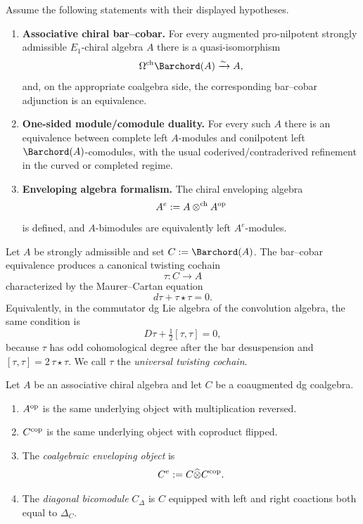 \begin{hypothesis}
\label{hyp:inputs}
Assume the following statements with their displayed hypotheses.
\begin{enumerate}[label=(I)]
\item \textbf{Associative chiral bar--cobar.}
For every augmented pro-nilpotent strongly admissible $E_1$-chiral algebra $A$ there is a
quasi-isomorphism
\[
\Cobar \Barchord(A)\xrightarrow{\sim} A,
\]
and, on the appropriate coalgebra side, the corresponding bar--cobar adjunction is an equivalence.

\item \textbf{One-sided module/comodule duality.}
For every such $A$ there is an equivalence between complete left $A$-modules and conilpotent left
$\Barchord(A)$-comodules, with the usual coderived/contraderived refinement in the curved or completed
regime.

\item \textbf{Enveloping algebra formalism.}
The chiral enveloping algebra
\[
A^e := A\mathbin{\otimes^{\mathrm{ch}}} A^{\mathrm{op}}
\]
is defined, and $A$-bimodules are equivalently left $A^e$-modules.
\end{enumerate}
\end{hypothesis}

\begin{definition}
Let $A$ be strongly admissible and set $C:=\Barchord(A)$. The bar--cobar equivalence produces a
canonical twisting cochain
\[
\tau:C\to A
\]
characterized by the Maurer--Cartan equation
\[
d\tau+\tau\star\tau=0.
\]
Equivalently, in the commutator dg Lie algebra of the convolution
algebra, the same condition is
\[
D\tau+\tfrac{1}{2}[\tau,\tau]=0,
\]
because $\tau$ has odd cohomological degree after the bar
desuspension and $[\tau,\tau]=2\,\tau\star\tau$.
We call $\tau$ the \emph{universal twisting cochain}.
\end{definition}

\begin{definition}
Let $A$ be an associative chiral algebra and let $C$ be a coaugmented dg coalgebra.
\begin{enumerate}[label=(\alph*)]
\item $A^{\mathrm{op}}$ is the same underlying object with multiplication reversed.
\item $C^{\mathrm{cop}}$ is the same underlying object with coproduct flipped.
\item The \emph{coalgebraic enveloping object} is
\[
C^e:=C\widehat\otimes C^{\mathrm{cop}}.
\]
\item The \emph{diagonal bicomodule} $C_\Delta$ is $C$ equipped with left and right coactions both
equal to $\Delta_C$.
\end{enumerate}
\end{definition}

